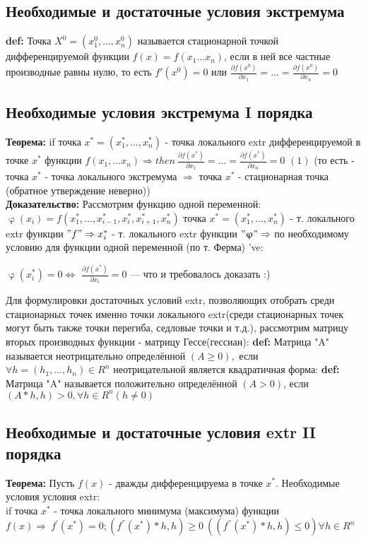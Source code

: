 \subsection*{Необходимые и достаточные условия экстремума}
\textbf{def:} Точка $X^0=(x^0_1,...,x^0_n)$ называется стационарной точкой дифференцируемой функции $f(x)=f(x_1... x_n)$, если в ней все частные производные равны нулю, то есть $f'(x^0)=0$ или $\frac{\partial f(x^0)}{\partial x_1} = ... = \frac{\partial f(x^0)}{\partial x_n} = 0$
\subsection*{Необходимые условия экстремума I порядка}
\textbf{Теорема: }if точка $x^*=(x_1^*, ..., x_n^*)$ - точка локального extr дифференцируемой в точке $x^* $ функции $ f(x_1, ... x_n) \Rightarrow then \ \frac{\partial f(x^*)}{\partial x_1} = ... = \frac{\partial f(x^*)}{\partial x_n} = 0$ $(1)$ (то есть - точка $x^{*}$ - точка локального экстремума $\Rightarrow$ точка $x^{*}$ - стационарная точка (обратное утверждение неверно)) \\ [2mm]
\textbf{Доказательство:} Рассмотрим функцию одной переменной:\\ $\upvarphi (x_i)=f(x_1^*,..., x_{i-1}^*, x_i^*, x_{i+1}^*, x_n^*)$ точка $x^*=(x_1^*,...,x_n^*)$ - т. локального extr функции $"f" \Rightarrow x_i^*$ - т. локального extr функции $"\upvarphi" \Rightarrow$ по необходимому условию для функции одной переменной (по т. Ферма) 've:
\begin{center}
$\upvarphi(x_i^*)=0 \Leftrightarrow $ $\frac{\partial f(x^*)}{\partial x_i} = 0$ --- что и требовалось доказать :)
\end{center}
Для формулировки достаточных условий extr, позволяющих отобрать среди стационарных точек именно точки локального extr(среди стационарных точек могут быть также точки перегиба, седловые точки и т.д.), рассмотрим матрицу вторых производных функции - матрицу Гессе(гессиан):
\textbf{def:} Матрица "A" называется неотрицательно определённой $(A \geq 0),$  если $\forall h = (h_1,...,h_n) \in R^n$ неотрицательной является квадратичная форма:
\textbf{def:} Матрица "A" называется положительно определённой $(A>0)$, если $(A*h, h)>0, \forall h \in R^n (h \neq 0)$
\newpage
\subsection*{Необходимые и достаточные условия extr II порядка}
\textbf{Теорема:} Пусть $f(x)$ - дважды дифференцируема в точке $x^*$. Необходимые условия условия extr: \\
if точка $x^*$ - точка локального минимума (максимума) функции $
f(x) \Rightarrow \  f^{'}(x^*)=0; (f^{''}(x^*)*h, h) \geq 0 \ ((f^{''}(x^*)*h, h) \leq 0) \forall h \in R^n$
